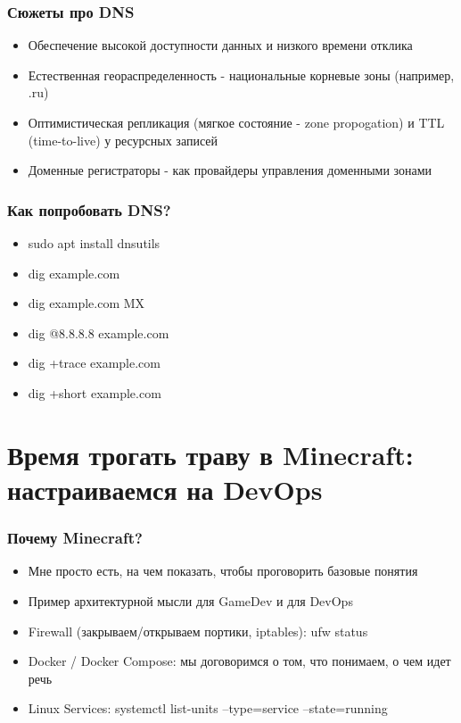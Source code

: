 \documentclass{beamer}
\begin{document}
\begin{frame}
  \frametitle{Сюжеты про DNS}

  \begin{itemize}
    \item Обеспечение высокой доступности данных и низкого времени отклика
    \item Естественная геораспределенность - национальные корневые зоны (например, .ru)
    \item Оптимистическая репликация (мягкое состояние - zone propogation) и TTL (time-to-live) у ресурсных записей
    \item Доменные регистраторы - как провайдеры управления доменными зонами
  \end{itemize}

\end{frame}

\begin{frame}
  \frametitle{Как попробовать DNS?}
  \begin{itemize}
    \item sudo apt install dnsutils
    \item dig example.com
    \item dig example.com MX
    \item dig @8.8.8.8 example.com
    \item dig +trace example.com
    \item dig +short example.com
  \end{itemize}
\end{frame}

\section{Время трогать траву в Minecraft: настраиваемся на DevOps}

\begin{frame}
  \frametitle{Почему Minecraft?}

  \begin{itemize}
    \item Мне просто есть, на чем показать, чтобы проговорить базовые понятия
    \item Пример архитектурной мысли для GameDev и для DevOps
    \item Firewall (закрываем/открываем портики, iptables): ufw status
    \item Docker / Docker Compose: мы договоримся о том, что понимаем, о чем идет речь
    \item Linux Services: systemctl list-units --type=service --state=running
  \end{itemize}

\end{frame}
\end{document}
